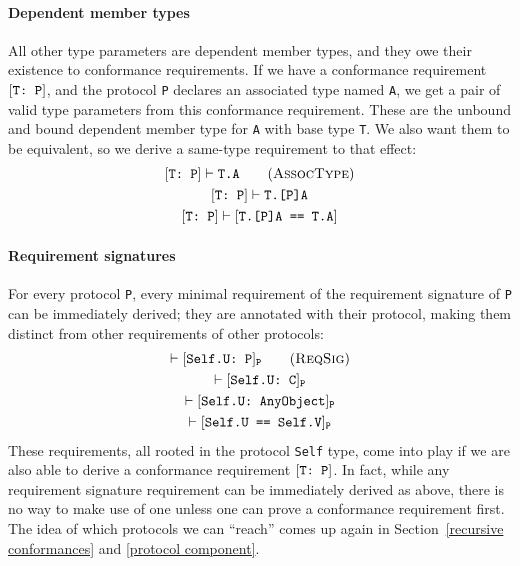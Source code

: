 \documentclass[../generics]{subfiles}
\begin{document}
\paragraph{Dependent member types} All other type parameters are dependent member types, and they owe their existence to conformance requirements. If we have a conformance requirement $[\texttt{T:~P}]$, and the protocol \texttt{P} declares an associated type named \texttt{A}, we get a pair of valid type parameters from this conformance requirement. These are the unbound and bound dependent member type for \texttt{A} with base type \texttt{T}. We also want them to be equivalent, so we derive a same-type requirement to that effect:
\begin{gather*}
\ConfReq{T}{P}\vdash\texttt{T.A}\tag{\textsc{AssocType}}\\
\ConfReq{T}{P}\vdash\texttt{T.[P]A}\\
\ConfReq{T}{P}\vdash\FormalReq{T.[P]A == T.A}
\end{gather*}

\paragraph{Requirement signatures}
 For every protocol \texttt{P}, every minimal requirement of the requirement signature of \texttt{P} can be immediately derived; they are annotated with their protocol, making them distinct from other requirements of other protocols:
\begin{gather*}
\vdash\ConfReq{Self.U}{P}_\texttt{P}\tag{\textsc{ReqSig}}\\
\vdash\ConfReq{Self.U}{C}_\texttt{P}\\
\vdash\ConfReq{Self.U}{AnyObject}_\texttt{P}\\
\vdash\FormalReq{Self.U == Self.V}_\texttt{P}
\end{gather*}
These requirements, all rooted in the protocol \texttt{Self} type, come into play if we are also able to derive a conformance requirement $[\texttt{T:~P}]$. In fact, while any requirement signature requirement can be immediately derived as above, there is no way to make use of one unless one can prove a conformance requirement first. The idea of which protocols we can ``reach'' comes up again in Section~\ref{recursive conformances} and \ref{protocol component}.
\end{document}
